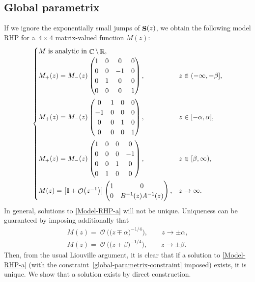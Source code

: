 \documentclass[10pt,a4paper]{amsart}
\DeclareMathOperator{\CC}{\mathbb{C}}
\DeclareMathOperator{\RR}{\mathbb{R}}
\DeclareMathOperator{\OO}{\mathcal{O}}
\DeclareMathOperator{\boldS}{{\bf S}}
\numberwithin{equation}{section}
\begin{document}
\subsection{Global parametrix}
If we ignore the exponentially small jumps of $\boldS(z)$, we obtain the following model RHP for a~${4\times 4}$ matrix-valued function $M(z)$:
\begin{equation}\label{Model-RHP-a}
 \begin{cases}
 \text{$M$ is analytic in $\CC\setminus\RR$},\\
 M_+(z) = M_-(z)
 \begin{pmatrix}
 1 & 0 & 0 & 0\\
 0 & 0 & -1 & 0\\
 0 & 1 & 0 & 0\\
 0 & 0 & 0 & 1\\
 \end{pmatrix}, & z \in (-\infty,-\beta],\vspace{1mm}\\
 M_+(z) = M_-(z)
 \begin{pmatrix}
 0 & 1 & 0 & 0\\
 -1 & 0 & 0 & 0\\
 0 & 0 & 1 & 0\\
 0 & 0 & 0 & 1\\
 \end{pmatrix}, & z \in [-\alpha,\alpha],\vspace{1mm}\\
 M_+(z) = M_-(z)
 \begin{pmatrix}
 1 & 0 & 0 & 0\\
 0 & 0 & 0 & -1\\
 0 & 0 & 1 & 0\\
 0 & 1 & 0 & 0\\
 \end{pmatrix}, & z \in [\beta,\infty),\vspace{1mm}\\
 M(z) =
 \bigl[\mathbb{I} + \OO\bigl(z^{-1}\bigr)\bigr]
 \begin{pmatrix}
 1 & 0\\
 0 & B^{-1}(z) A^{-1}(z)
 \end{pmatrix},
 & z \to \infty.
 \end{cases}
\end{equation}
In general, solutions to \eqref{Model-RHP-a} will not be unique. Uniqueness can be guaranteed by imposing additionally that
\begin{gather}
 M(z) = \OO\bigl( \bigl(z\mp \alpha\bigr)^{-1/4} \bigr), \qquad z\to \pm \alpha,\nonumber\\
 M(z) = \OO\bigl( \bigl(z\mp \beta\bigr)^{-1/4} \bigr), \qquad z\to \pm \beta.\label{global-parametrix-constraint}
\end{gather}
Then, from the usual Liouville argument, it is clear that if a solution to \eqref{Model-RHP-a} (with the constraint~\eqref{global-parametrix-constraint} imposed) exists, it is unique. We show that a solution exists by direct construction.
\end{document}
